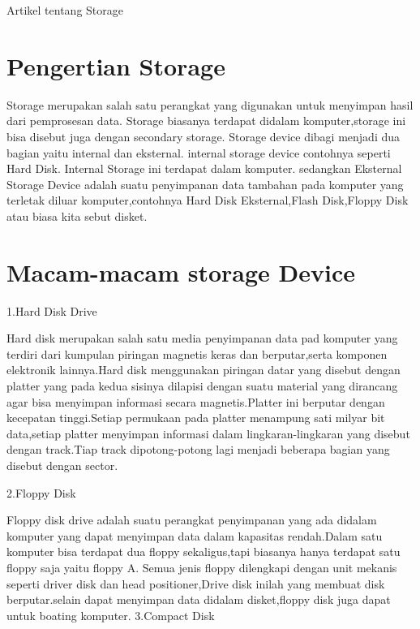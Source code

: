 






Artikel tentang Storage





\section{Pengertian Storage}
Storage merupakan salah satu perangkat yang digunakan untuk menyimpan hasil dari pemprosesan data. Storage biasanya terdapat didalam komputer,storage ini bisa disebut juga dengan secondary storage.
Storage device dibagi menjadi dua bagian yaitu internal dan eksternal. internal storage device contohnya seperti Hard Disk. Internal Storage ini terdapat dalam komputer. sedangkan Eksternal Storage Device adalah suatu penyimpanan data tambahan pada komputer yang terletak diluar komputer,contohnya Hard Disk Eksternal,Flash Disk,Floppy Disk atau biasa kita sebut disket.
\section{Macam-macam storage Device}

1.Hard Disk Drive

Hard disk merupakan salah satu media penyimpanan data pad komputer yang terdiri dari kumpulan piringan magnetis keras dan berputar,serta komponen elektronik lainnya.Hard disk menggunakan piringan datar yang disebut dengan platter yang pada kedua sisinya dilapisi dengan suatu material yang dirancang agar bisa menyimpan informasi secara magnetis.Platter ini berputar dengan kecepatan tinggi.Setiap permukaan pada platter menampung sati milyar bit data,setiap platter menyimpan informasi dalam lingkaran-lingkaran yang disebut dengan track.Tiap track dipotong-potong lagi menjadi beberapa bagian yang disebut dengan sector.

2.Floppy Disk

Floppy disk drive adalah suatu perangkat penyimpanan yang ada didalam komputer yang dapat menyimpan data dalam kapasitas rendah.Dalam satu komputer bisa terdapat dua floppy sekaligus,tapi biasanya hanya terdapat satu floppy saja yaitu floppy A. Semua jenis floppy dilengkapi dengan unit mekanis seperti driver disk dan head positioner,Drive disk inilah yang membuat disk berputar.selain dapat menyimpan data didalam disket,floppy disk juga dapat untuk boating komputer.
3.Compact Disk

